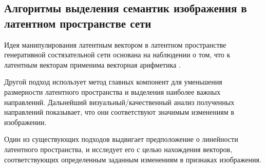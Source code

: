 \subsection{Алгоритмы выделения семантик изображения в латентном пространстве сети}
Идея манипулирования латентным вектором в латентном пространстве генеративной состязательной сети основана на наблюдении о том, что к латентным векторам применима векторная арифметика \cite{radford2015unsupervised}.

Другой подход \cite{hrknen2020ganspace} использует метод главных компонент для уменьшения размерности латентного пространства и выделения наиболее важных направлений. Дальнейший визуальный/качественный анализ полученных направлений показывает, что они соответствуют значимым изменениям в изображении.

Один из существующих подходов \cite{shen2020interfacegan} выдвигает предположение о линейности латентного пространства, и исследует его с целью нахождения векторов, соответствующих определенным заданным изменениям в признаках изображения.
